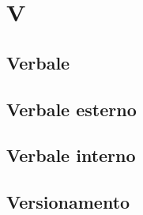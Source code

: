 \section{V} 
\subsection{Verbale} 

\subsection{Verbale esterno} 

\subsection{Verbale interno} 

\subsection{Versionamento} 

